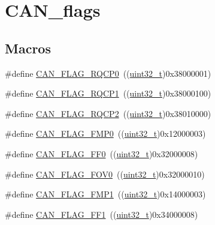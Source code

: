 \hypertarget{group___c_a_n__flags}{}\section{C\+A\+N\+\_\+flags}
\label{group___c_a_n__flags}
\subsection*{Macros}
\begin{DoxyCompactItemize}
\item 
\#define \hyperlink{group___c_a_n__flags_ga6df0579049eb471720ea103c5446298b}{C\+A\+N\+\_\+\+F\+L\+A\+G\+\_\+\+R\+Q\+C\+P0}~((\hyperlink{_p_e___types_8h_a33594304e786b158f3fb30289278f5af}{uint32\+\_\+t})0x38000001)
\item 
\#define \hyperlink{group___c_a_n__flags_gaba705586ebc3d961507436c03a2feaba}{C\+A\+N\+\_\+\+F\+L\+A\+G\+\_\+\+R\+Q\+C\+P1}~((\hyperlink{_p_e___types_8h_a33594304e786b158f3fb30289278f5af}{uint32\+\_\+t})0x38000100)
\item 
\#define \hyperlink{group___c_a_n__flags_ga9c20cd47e558135bd7ae71149583d487}{C\+A\+N\+\_\+\+F\+L\+A\+G\+\_\+\+R\+Q\+C\+P2}~((\hyperlink{_p_e___types_8h_a33594304e786b158f3fb30289278f5af}{uint32\+\_\+t})0x38010000)
\item 
\#define \hyperlink{group___c_a_n__flags_ga4b40574700edfe752433bb4e0d457c64}{C\+A\+N\+\_\+\+F\+L\+A\+G\+\_\+\+F\+M\+P0}~((\hyperlink{_p_e___types_8h_a33594304e786b158f3fb30289278f5af}{uint32\+\_\+t})0x12000003)
\item 
\#define \hyperlink{group___c_a_n__flags_ga11648741ff43af1561ce7009698fb797}{C\+A\+N\+\_\+\+F\+L\+A\+G\+\_\+\+F\+F0}~((\hyperlink{_p_e___types_8h_a33594304e786b158f3fb30289278f5af}{uint32\+\_\+t})0x32000008)
\item 
\#define \hyperlink{group___c_a_n__flags_ga2abd66b5e0032132673208decd2d01f2}{C\+A\+N\+\_\+\+F\+L\+A\+G\+\_\+\+F\+O\+V0}~((\hyperlink{_p_e___types_8h_a33594304e786b158f3fb30289278f5af}{uint32\+\_\+t})0x32000010)
\item 
\#define \hyperlink{group___c_a_n__flags_ga5d4b7376954a059fbd74ed8d688f6657}{C\+A\+N\+\_\+\+F\+L\+A\+G\+\_\+\+F\+M\+P1}~((\hyperlink{_p_e___types_8h_a33594304e786b158f3fb30289278f5af}{uint32\+\_\+t})0x14000003)
\item 
\#define \hyperlink{group___c_a_n__flags_ga0fa967743c5db04189bb2160aa48e371}{C\+A\+N\+\_\+\+F\+L\+A\+G\+\_\+\+F\+F1}~((\hyperlink{_p_e___types_8h_a33594304e786b158f3fb30289278f5af}{uint32\+\_\+t})0x34000008)

\end{DoxyCompactItemize}
